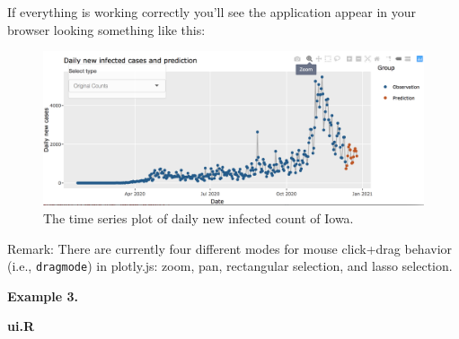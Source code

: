 \documentclass[]{book}
\newenvironment{Shaded}{\begin{snugshade}}{\end{snugshade}}
\newcommand{\KeywordTok}[1]{\textcolor[rgb]{0.13,0.29,0.53}{\textbf{#1}}}
\newcommand{\DataTypeTok}[1]{\textcolor[rgb]{0.13,0.29,0.53}{#1}}
\newcommand{\StringTok}[1]{\textcolor[rgb]{0.31,0.60,0.02}{#1}}
\newcommand{\ControlFlowTok}[1]{\textcolor[rgb]{0.13,0.29,0.53}{\textbf{#1}}}
\newcommand{\OperatorTok}[1]{\textcolor[rgb]{0.81,0.36,0.00}{\textbf{#1}}}
\newcommand{\NormalTok}[1]{#1}
\begin{document}
\begin{Shaded}
\end{Shaded}

If everything is working correctly you'll see the application appear in
your browser looking something like this:

\begin{figure}
\centering
\includegraphics{figures/dailynew.png}
\caption{The time series plot of daily new infected count of Iowa.}
\end{figure}

Remark: There are currently four different modes for mouse click+drag
behavior (i.e., \texttt{dragmode}) in plotly.js: zoom, pan, rectangular
selection, and lasso selection.

\textbf{Example 3.}

\textbf{ui.R}
\end{document}
